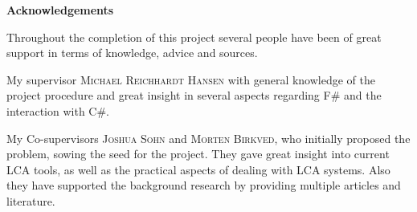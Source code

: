 \begin{center}
    \Large \textbf{Acknowledgements}
\end{center}
\vspace{1cm}

Throughout the completion of this project several people have been of great support in terms of knowledge, advice and sources. 

My supervisor \textsc{Michael Reichhardt Hansen} with general knowledge of the project procedure and great insight in several aspects regarding F\# and the interaction with C\#. 

My Co-supervisors \textsc{Joshua Sohn} and \textsc{Morten Birkved}, who initially proposed the problem, sowing the seed for the project. They gave great insight into current LCA tools, as well as the practical aspects of dealing with LCA systems. Also they have supported the background research by providing multiple articles and literature.
\vfill